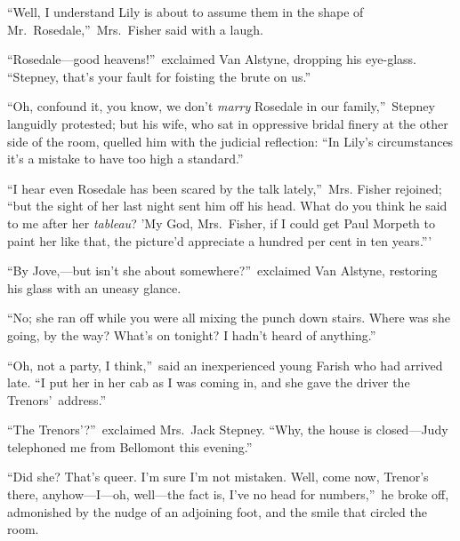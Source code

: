 \documentclass[12pt,a4paper]{book}
\begin{document}
``Well, I understand Lily is about to assume them in the shape of
Mr.\ Rosedale,''\ Mrs.\ Fisher said with a laugh.





``Rosedale---good heavens!''\ exclaimed Van Alstyne, dropping his
eye-glass. ``Stepney, that's your fault for foisting the brute on
us.''





``Oh, confound it, you know, we don't \textit{marry} Rosedale in our
family,''\ Stepney languidly protested; but his wife, who
sat in oppressive bridal finery at the other side of the room,
quelled him with the judicial reflection: ``In Lily's
circumstances it's a mistake to have too high a standard.''





``I hear even Rosedale has been scared by the talk lately,''\ Mrs.
Fisher rejoined; ``but the sight of her last night sent him off
his head. What do you think he said to me after her \textit{tableau}? 
'My God, Mrs.\ Fisher, if I could get Paul Morpeth to paint her
like that, the picture'd appreciate a hundred per cent in ten
years.'''





``By Jove,---but isn't she about somewhere?''\ exclaimed Van Alstyne,
restoring his glass with an uneasy glance.





``No; she ran off while you were all mixing the punch down stairs. 
Where was she going, by the way? What's on tonight? I hadn't
heard of anything.''





``Oh, not a party, I think,''\ said an inexperienced young Farish
who had arrived late. ``I put her in her cab as I was coming in,
and she gave the driver the Trenors'\ address.''





``The Trenors'?''\ exclaimed Mrs.\ Jack Stepney. ``Why, the house is
closed---Judy telephoned me from Bellomont this evening.''





``Did she? That's queer. I'm sure I'm not mistaken. Well, come
now, Trenor's there, anyhow---I---oh, well---the fact is, I've no
head for numbers,''\ he broke off, admonished by the nudge of an
adjoining foot, and the smile that circled the room.
\end{document}
